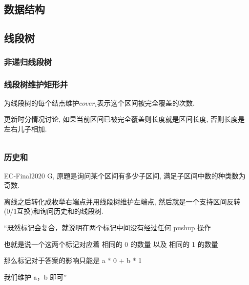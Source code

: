 \documentclass[a4paper, twoside]{article}
\begin{document}
\begin{multicols}{2}


			
		\newpage
		\section{数据结构}

			\subsection{线段树}
				\subsubsection{非递归线段树}
					
				
				\subsubsection{线段树维护矩形并}
					为线段树的每个结点维护$cover_i$表示这个区间被完全覆盖的次数.

					更新时分情况讨论, 如果当前区间已被完全覆盖则长度就是区间长度, 否则长度是左右儿子相加.
					\inputminted{cpp}{../src/datastructure/线段树维护矩形并.cpp}
				
				\subsubsection{历史和}

					EC-Final2020 G, 原题是询问某个区间有多少子区间, 满足子区间中数的种类数为奇数.

					离线之后转化成枚举右端点并用线段树维护左端点, 然后就是一个支持区间反转(0/1互换)和询问历史和的线段树.

					``既然标记会复合，就说明在两个标记中间没有经过任何 pushup 操作

					也就是说一个这两个标记对应着 相同的 0 的数量 以及 相同的 1 的数量

					那么标记对于答案的影响只能是 a * 0 + b * 1

					我们维护 a，b 即可''

					\inputminted{cpp}{../src/datastructure/ec20g.cpp}


\end{multicols}
\end{document}
